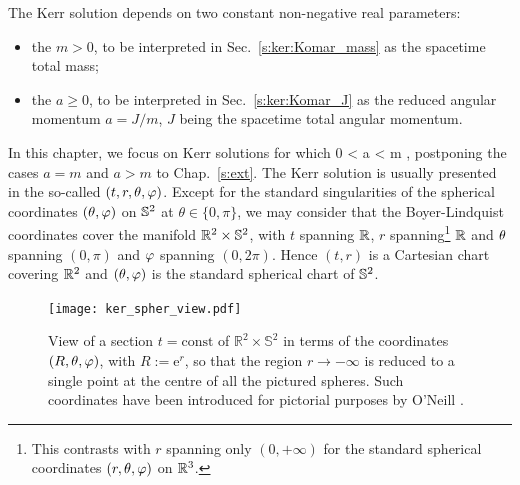The Kerr solution depends on two constant non-negative real parameters:
\begin{itemize}
\item the  $m > 0$, to be
interpreted in Sec.~\ref{s:ker:Komar_mass} as the spacetime total mass;
\item the  $a \geq 0 $,
to be interpreted in Sec.~\ref{s:ker:Komar_J} as the reduced angular momentum  $a=J/m$, $J$ being the
spacetime total angular momentum.
\end{itemize}
In this chapter, we focus on Kerr solutions for which
\be \label{e:ker:a_lower_m}
    0 < a < m ,
\ee
postponing the cases $a=m$ and $a>m$ to Chap.~\ref{s:ext}.
The Kerr solution is usually presented in the so-called
$(t,r,\theta,\varphi)$. Except for the standard singularities of the
spherical coordinates $(\theta,\varphi)$ on $\mathbb{S}^2$ at $\theta\in\{0,\pi\}$,
we may consider that the Boyer-Lindquist coordinates cover the manifold
$\mathbb{R}^2\times\mathbb{S}^2$, with $t$ spanning $\mathbb{R}$, $r$
spanning\footnote{This contrasts with $r$ spanning only $(0,+\infty)$ for
the standard spherical coordinates $(r,\theta,\varphi)$ on $\mathbb{R}^3$.} $\mathbb{R}$ and
$\theta$ spanning $(0,\pi)$ and $\varphi$ spanning $(0,2\pi)$. Hence
$(t,r)$ is a Cartesian chart covering $\mathbb{R}^2$ and $(\theta,\varphi)$ is the standard
spherical chart of $\mathbb{S}^2$.

\begin{figure}
\centerline{\texttt{[image: ker\_spher\_view.pdf]}}
\caption[]{\label{f:ker:spher_view} \footnotesize
View of a section $t=\mathrm{const}$ of $\mathbb{R}^2\times\mathbb{S}^2$
in terms of the coordinates $(R,\theta,\varphi)$, with $R:=\mathrm{e}^r$,
so that the region $r\rightarrow -\infty$
is reduced to a single point at the centre of all the pictured spheres.
Such coordinates have been introduced for pictorial purposes by O'Neill
\cite{ONeil95}.}
\end{figure}


